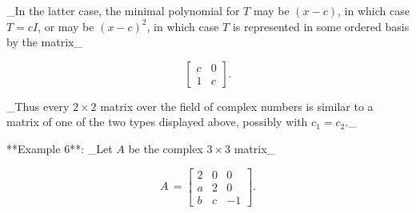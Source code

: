 _In the latter case, the minimal polynomial for \(T\) may be \((x-c)\), in which case \(T=cI\), or may be \((x-c)^{2}\), in which case \(T\) is represented in some ordered basis by the matrix_

\[\begin{bmatrix}c&0\\ 1&c\end{bmatrix}.\]

_Thus every \(2\times 2\) matrix over the field of complex numbers is similar to a matrix of one of the two types displayed above, possibly with \(c_{1}=c_{2}\)._

**Example 6**: _Let \(A\) be the complex \(3\times 3\) matrix_

\[A\,=\!\!\begin{bmatrix}2&0&0\\ a&2&0\\ b&c&-1\end{bmatrix}.\] 